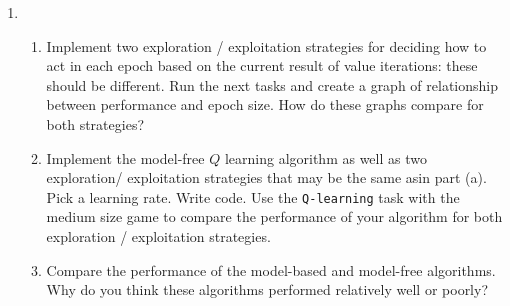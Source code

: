 \documentclass{article}
\begin{document}
\begin{enumerate}
\item 
  \begin{enumerate}
  \item {Implement two exploration / exploitation strategies for deciding how to act
  in each epoch based on the current result of value iterations: these should be different.
  Run the next tasks and create a graph of relationship between performance and epoch
  size. How do these graphs compare for both strategies?}

  \item {Implement the model-free $Q$ learning algorithm as well as two exploration/
  exploitation strategies that may be the same asin part (a). Pick a learning rate. Write 
  code. Use the \texttt{Q-learning} task with the medium size game to compare the 
  performance of your algorithm for both exploration / exploitation strategies.}

  \item {Compare the performance of the model-based and model-free algorithms. Why 
  do you think these algorithms performed relatively well or poorly?}


  \end{enumerate}

\end{enumerate}
\end{document}
